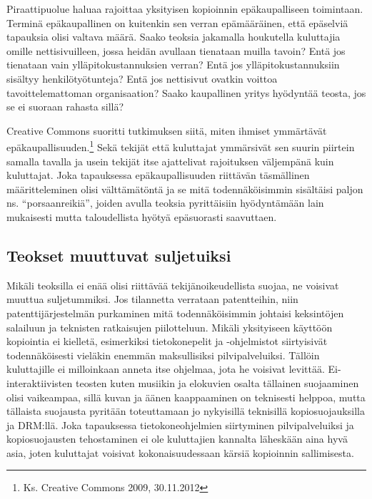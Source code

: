\documentclass[titlepage,12pt]{article}
\begin{document}
Piraattipuolue haluaa rajoittaa yksityisen kopioinnin epäkaupalliseen
toimintaan.  Terminä epäkaupallinen on kuitenkin sen verran
epämääräinen, että epäselviä tapauksia olisi valtava määrä.  Saako
teoksia jakamalla houkutella kuluttajia omille nettisivuilleen, jossa
heidän avullaan tienataan muilla tavoin? Entä jos tienataan vain
ylläpitokustannuksien verran?  Entä jos ylläpitokustannuksiin sisältyy
henkilötyötunteja?  Entä jos nettisivut ovatkin voittoa
tavoittelemattoman organisaation?  Saako kaupallinen yritys hyödyntää
teosta, jos se ei suoraan rahasta sillä?

Creative Commons suoritti tutkimuksen siitä, miten ihmiset ymmärtävät
epäkaupallisuuden.\footnote{Ks. Creative Commons 2009, 30.11.2012}
Sekä tekijät että kuluttajat ymmärsivät sen suurin piirtein samalla
tavalla ja usein tekijät itse ajattelivat rajoituksen väljempänä kuin
kuluttajat.  Joka tapauksessa epäkaupallisuuden riittävän täsmällinen
määritteleminen olisi välttämätöntä ja se mitä todennäköisimmin
sisältäisi paljon ns. ``porsaanreikiä'', joiden avulla teoksia
pyrittäisiin hyödyntämään lain mukaisesti mutta taloudellista hyötyä
epäsuorasti saavuttaen.






\subsection{Teokset muuttuvat suljetuiksi}

Mikäli teoksilla ei enää olisi riittävää tekijänoikeudellista suojaa,
ne voisivat muuttua suljetummiksi.  Jos tilannetta verrataan
patentteihin, niin patenttijärjestelmän purkaminen mitä
todennäköisimmin johtaisi keksintöjen salailuun ja teknisten
ratkaisujen piilotteluun.  Mikäli yksityiseen käyttöön kopiointia ei
kielletä, esimerkiksi tietokonepelit ja -ohjelmistot siirtyisivät
todennäköisesti vieläkin enemmän maksullisiksi pilvipalveluiksi.
Tällöin kuluttajille ei milloinkaan anneta itse ohjelmaa, jota he
voisivat levittää.  Ei-interaktiivisten teosten kuten musiikin ja
elokuvien osalta tällainen suojaaminen olisi vaikeampaa, sillä kuvan
ja äänen kaappaaminen on teknisesti helppoa, mutta tällaista suojausta
pyritään toteuttamaan jo nykyisillä teknisillä kopiosuojauksilla ja
DRM:llä.  Joka tapauksessa tietokoneohjelmien siirtyminen
pilvipalveluiksi ja kopiosuojausten tehostaminen ei ole kuluttajien
kannalta läheskään aina hyvä asia, joten kuluttajat voisivat
kokonaisuudessaan kärsiä kopioinnin sallimisesta.
\end{document}
